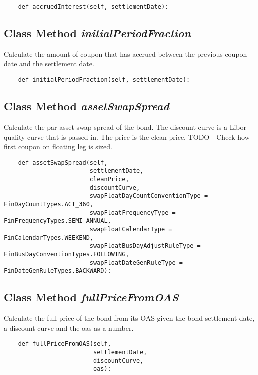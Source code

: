 \documentclass[twoside,11pt]{book}
\begin{document}
\begin{lstlisting}
    def accruedInterest(self, settlementDate):
\end{lstlisting}

\subsection{Class Method {\it initialPeriodFraction}}
Calculate the amount of coupon that has accrued between the previous coupon date and the settlement date. 

\begin{lstlisting}
    def initialPeriodFraction(self, settlementDate):
\end{lstlisting}

\subsection{Class Method {\it assetSwapSpread}}
Calculate the par asset swap spread of the bond. The discount curve is a Libor quality curve that is passed in. The price is the clean price. TODO - Check how first coupon on floating leg is sized. 

\begin{lstlisting}
    def assetSwapSpread(self, 
                        settlementDate, 
                        cleanPrice, 
                        discountCurve, 
                        swapFloatDayCountConventionType = FinDayCountTypes.ACT_360, 
                        swapFloatFrequencyType = FinFrequencyTypes.SEMI_ANNUAL,
                        swapFloatCalendarType = FinCalendarTypes.WEEKEND,
                        swapFloatBusDayAdjustRuleType = FinBusDayConventionTypes.FOLLOWING,
                        swapFloatDateGenRuleType = FinDateGenRuleTypes.BACKWARD):
\end{lstlisting}

\subsection{Class Method {\it fullPriceFromOAS}}
Calculate the full price of the bond from its OAS given the bond settlement date, a discount curve and the oas as a number. 

\begin{lstlisting}
    def fullPriceFromOAS(self, 
                         settlementDate, 
                         discountCurve, 
                         oas):
\end{lstlisting}
\end{document}
